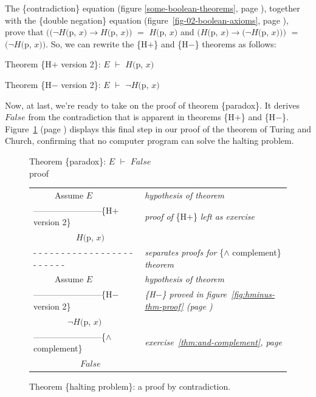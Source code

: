 The \{contradiction\} equation 
(figure \ref{some-boolean-theorems}, page \pageref{some-boolean-theorems}),
together with the \{double negation\} equation
(figure~\ref{fig-02-boolean-axioms}, page \pageref{fig-02-boolean-axioms}),
prove that
$((\neg H($\textsf{p}, $x) \rightarrow H($\textsf{p}, $x))$ $=$ $H($\textsf{p}, $x)$
and
$(H($\textsf{p}, $x) \rightarrow (\neg H($\textsf{p}, $x)))$ $=$ $(\neg H($\textsf{p}, $x))$.
So, we can rewrite the \{H$+$\} and \{H$-$\} theorems as follows:

\label{thm:HplusHminus}\hspace*{2mm}Theorem \{H$+$ version 2\}: $E$ $\vdash$ $H($\textsf{p}, $x)$

\hspace*{2mm}Theorem \{H$-$ version 2\}: $E$ $\vdash$ $\neg H($\textsf{p}, $x)$
\vspace{2mm}

Now, at last, we're ready to take on
the proof of theorem \{paradox\}.
It derives $False$ from the contradiction that is apparent
in theorems \{H$+$\} and \{H$-$\}.
Figure~\ref{fig:proof-paradox-thm} (page \pageref{fig:proof-paradox-thm})
displays this final step in our proof
of the theorem of Turing and Church,
confirming that no computer program can solve the halting problem.

\begin{figure}
Theorem \{paradox\}: $E$ $\vdash$ $False$\\
proof
\begin{center}
\begin{tabular}{ll}
~~~~~Assume $E$                                 &\emph{hypothesis of theorem}\\
------------------------\{H$+$ version 2\}      &\emph{proof of} \{H$+$\} \emph{left as exercise}\\
~~~~~~~~~~$H($\textsf{p}, $x)$                  &\\
 - - - - - - - - - - - - - - - - - - - - - - - -&\emph{separates proofs for} \{$\wedge$ complement\} \emph{theorem}\\
~~~~~Assume $E$                                 &\emph{hypothesis of theorem}\\
------------------------\{H$-$ version 2\}      &\emph{\{H$-$\} proved in figure~\ref{fig:hminus-thm-proof} (page \pageref{fig:hminus-thm-proof})}\\
~~~~~~~~$\neg H($\textsf{p}, $x)$               &\\
------------------------\{$\wedge$ complement\} &\emph{exercise~\ref{thm:and-complement}, page \pageref{thm:and-complement}}\\
~~~~~~~~~~~$False$                              &\\
\end{tabular}
\end{center}
\caption{Theorem \{halting problem\}: a proof by contradiction.}
\label{fig:proof-paradox-thm}
\end{figure}

